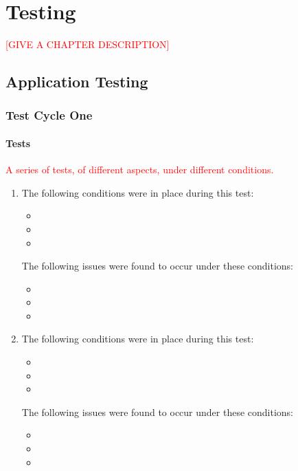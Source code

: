 \def\baselinestretch{1}

\chapter{Testing}
\label{chapter:Testing}

\def\baselinestretch{1.66}



\textcolor{red}{[GIVE A CHAPTER DESCRIPTION]}

\goodbreak

\section{Application Testing}
\label{sec:ApplicationTesting}

 \subsection{Test Cycle One}
 \label{sec:ApplicationTesting:TestCycleOne}
 
 \subsubsection{Tests}
 \label{sec:ApplicationTesting:TestCycleOne:Tests}
 \textcolor{red}{A series of tests, of different aspects, under different conditions.}
 \begin{enumerate}
 \item The following conditions were in place during this test:
 \begin{itemize}
 \item
 \item
 \item
 \end{itemize}
 
 The following issues were found to occur under these conditions:
 \begin{itemize}
 \item
 \item
 \item
 \end{itemize}
 \item The following conditions were in place during this test:
  \begin{itemize}
  \item
  \item
  \item
  \end{itemize}
  
  The following issues were found to occur under these conditions:
  \begin{itemize}
  \item
  \item
  \item
  \end{itemize}
 \end{enumerate}
